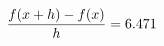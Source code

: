 \documentclass[preview]{standalone}
\begin{document}
\begin{align*}
\special{dvisvgm:raw <g id='unique000'>}\frac{f(x+h)-f(x)}{h} = 6.471\special{dvisvgm:raw </g>}
\end{align*}
\end{document}
